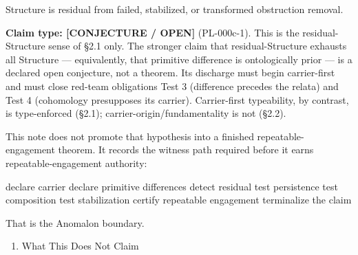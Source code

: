 \documentclass[
  10pt,
]{article}
\newenvironment{Shaded}{}{}
\newcommand{\NormalTok}[1]{#1}
\providecommand{\tightlist}{%
  \setlength{\itemsep}{0pt}\setlength{\parskip}{0pt}}
\providecommand{\tightlist}{%
  \setlength{\itemsep}{0pt}\setlength{\parskip}{0pt}}
\begin{document}
\begin{Shaded}
\begin{Highlighting}[]
\NormalTok{Structure is residual from failed, stabilized, or transformed obstruction removal.}
\end{Highlighting}
\end{Shaded}

\textbf{Claim type: {[}CONJECTURE / OPEN{]}} (PL-000c-1). This is the residual-Structure sense of §2.1 only. The stronger claim that residual-Structure exhausts all Structure --- equivalently, that primitive difference is ontologically prior --- is a declared open conjecture, not a theorem. Its discharge must begin carrier-first and must close red-team obligations Test 3 (difference precedes the relata) and Test 4 (cohomology presupposes its carrier). Carrier-first typeability, by contrast, is type-enforced (§2.1); carrier-origin/fundamentality is not (§2.2).

This note does not promote that hypothesis into a finished repeatable-engagement theorem. It records the witness path required before it earns repeatable-engagement authority:

\begin{Shaded}
\begin{Highlighting}[]
\NormalTok{declare carrier}
\NormalTok{declare primitive differences}
\NormalTok{detect residual}
\NormalTok{test persistence}
\NormalTok{test composition}
\NormalTok{test stabilization}
\NormalTok{certify repeatable engagement}
\NormalTok{terminalize the claim}
\end{Highlighting}
\end{Shaded}

That is the Anomalon boundary.

\begin{enumerate}
\def\labelenumi{\arabic{enumi}.}
\setcounter{enumi}{9}
\tightlist
\item
  What This Does Not Claim
\end{enumerate}
\end{document}

